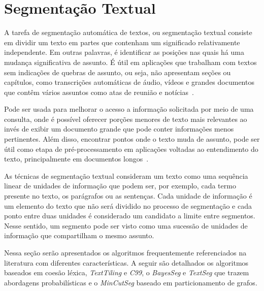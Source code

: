 
\section{Segmentação Textual} \label{sec:segmentacao}






A tarefa de segmentação automática de textos, ou segmentação textual consiste em dividir um texto em partes que contenham um significado relativamente independente. Em outras palavras, é identificar as posições nas quais há uma mudança significativa de assunto. É útil em aplicações que trabalham com textos sem indicações de quebras de assunto, ou seja, não apresentam seções ou capítulos, como transcrições automáticas de áudio, vídeos e grandes documentos que contêm vários assuntos como atas de reunião e notícias~\cite{Aggarwal2018, bokaei2015a, sakahara2014a, misra2009a, Eis2008}.

Pode ser usada para melhorar o acesso a informação solicitada por meio de uma consulta, onde é possível oferecer porções menores de texto mais relevantes ao invés de exibir um documento grande que pode conter informações menos pertinentes.  Além disso, encontrar pontos onde o texto muda de assunto, pode ser útil como etapa de pré-processamento em aplicações voltadas ao entendimento do texto, principalmente em documentos longos~\cite{Choi2001-LSA}.

As técnicas de segmentação textual consideram um texto como uma sequência linear de unidades de informação que podem ser, por exemplo, cada termo presente no texto, os parágrafos ou as sentenças. Cada unidade de informação é um elemento do texto que não será dividido no processo de segmentação e cada ponto entre duas unidades é considerado um candidato a limite entre segmentos. Nesse sentido, um segmento pode ser visto como uma sucessão de unidades de informação que compartilham o mesmo assunto.


Nessa seção serão apresentados os algoritmos frequentemente referenciados na literatura  com diferentes características. A seguir são detalhados os algoritmos baseados em coesão léxica, \textit{TextTiling} e \textit{C99}, o \textit{BayesSeg} e \textit{TextSeg} que trazem abordagens probabilísticas e o \textit{MinCutSeg} baseado em particionamento de grafos.















